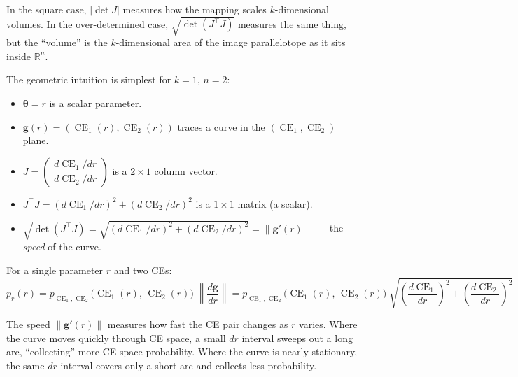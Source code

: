 \documentclass[11pt,a4paper]{article}
\theoremstyle{definition}
\newcommand{\btheta}{\boldsymbol{\theta}}
\DeclareMathOperator{\CE}{CE}
\begin{document}
In the square case, $|\!\det J|$ measures how the mapping scales
$k$-dimensional volumes. In the over-determined case,
$\sqrt{\det(J^\top J)}$ measures the same thing, but the ``volume'' is the
$k$-dimensional area of the image parallelotope as it sits inside
$\mathbb{R}^n$.

The geometric intuition is simplest for $k = 1$, $n = 2$:

\begin{itemize}
    \item $\btheta = r$ is a scalar parameter.
    \item $\mathbf{g}(r) = (\CE_1(r), \CE_2(r))$ traces a curve in the
    $(\CE_1, \CE_2)$ plane.
    \item $J = \begin{pmatrix} d\CE_1/dr \\ d\CE_2/dr \end{pmatrix}$ is a
    $2 \times 1$ column vector.
    \item $J^\top J = (d\CE_1/dr)^2 + (d\CE_2/dr)^2$ is a $1 \times 1$
    matrix (a scalar).
    \item $\sqrt{\det(J^\top J)} = \sqrt{(d\CE_1/dr)^2 + (d\CE_2/dr)^2}
    = \|\mathbf{g}'(r)\|$ --- the \emph{speed} of the curve.
\end{itemize}

\begin{keyresult}
For a single parameter $r$ and two CEs:
\begin{equation}
    \label{eq:1in2}
    p_r(r) = p_{\CE_1, \CE_2}\!\big(\CE_1(r),\, \CE_2(r)\big) \;
    \left\|\frac{d\mathbf{g}}{dr}\right\|
    = p_{\CE_1, \CE_2}\!\big(\CE_1(r),\, \CE_2(r)\big) \;
    \sqrt{\left(\frac{d\CE_1}{dr}\right)^{\!2}
    + \left(\frac{d\CE_2}{dr}\right)^{\!2}}
\end{equation}
\end{keyresult}

\noindent
The speed $\|\mathbf{g}'(r)\|$ measures how fast the CE pair changes as $r$
varies. Where the curve moves quickly through CE space, a small $dr$ interval
sweeps out a long arc, ``collecting'' more CE-space probability. Where the
curve is nearly stationary, the same $dr$ interval covers only a short arc
and collects less probability.
\end{document}
